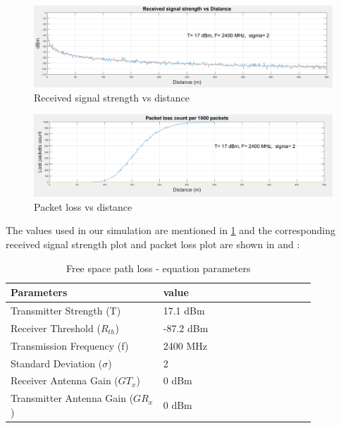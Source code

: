 \begin{figure}[hbtp]
\centering
\includegraphics[width=1\textwidth]{ncsuthesis-0.6/Chapter-4/figs/signal_strength}
\caption{Received signal strength vs distance}
\label{fig:signal_strength}
\end{figure}
\begin{figure}[hbtp]
\centering
\includegraphics[width=1\textwidth]{ncsuthesis-0.6/Chapter-4/figs/packet_loss}
\caption{Packet loss vs distance}
\label{fig:packet_loss}
\end{figure}
The values used in our simulation are mentioned in \ref{tab:fspl_parameters} and the corresponding received signal strength plot and packet loss plot are shown in  and :

\begin{table}
\caption{Free space path loss - equation parameters}
\label{tab:fspl_parameters}
\begin{tabular}{|p{0.43\linewidth}|p{0.43\linewidth}|}
\toprule
Parameters & value \cite{wilink}\\
\midrule
Transmitter Strength (T) & 17.1  dBm \\
\midrule
Receiver Threshold ($R_{th}$)	& -87.2 dBm  \\
\midrule
Transmission Frequency (f) & 2400 MHz \\
\midrule
Standard Deviation ($\sigma$) & 2\\
\midrule
Receiver Antenna Gain ($GT_x$) & 0 dBm\\
\midrule
Transmitter Antenna Gain ($GR_x$) & 0 dBm \\
\bottomrule
\end{tabular}
\end{table}


